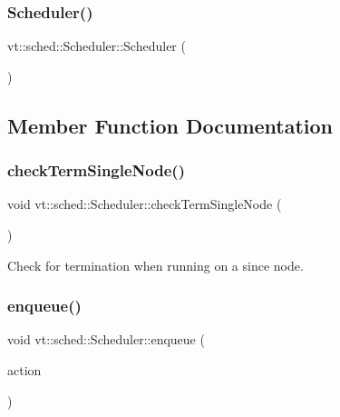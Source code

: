\subsubsection{\texorpdfstring{Scheduler()}{Scheduler()}}
{\footnotesize\ttfamily vt\+::sched\+::\+Scheduler\+::\+Scheduler (\begin{DoxyParamCaption}{ }\end{DoxyParamCaption})}



\subsection{Member Function Documentation}
\mbox{\label{structvt_1_1sched_1_1_scheduler_ad1b05fb0d94a3e707d7733ef5206b7c8}} 
\subsubsection{\texorpdfstring{check\+Term\+Single\+Node()}{checkTermSingleNode()}}
{\footnotesize\ttfamily void vt\+::sched\+::\+Scheduler\+::check\+Term\+Single\+Node (\begin{DoxyParamCaption}{ }\end{DoxyParamCaption})\hspace{0.3cm}{\ttfamily [static]}}



Check for termination when running on a since node. 

\mbox{\label{structvt_1_1sched_1_1_scheduler_a82a78f782999127d461208bc948268a4}} 
\subsubsection{\texorpdfstring{enqueue()}{enqueue()}\hspace{0.1cm}{\footnotesize\ttfamily [1/4]}}
{\footnotesize\ttfamily void vt\+::sched\+::\+Scheduler\+::enqueue (\begin{DoxyParamCaption}\item[{\hyperlink{namespacevt_ae0a5a7b18cc99d7b732cb4d44f46b0f3}{Action\+Type}}]{action }\end{DoxyParamCaption})}



